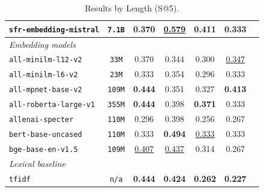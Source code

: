 \documentclass{article}
\begin{document}
\begin{table}[h!]
{\begin{tabular}{lcccccc}
\texttt{sfr-embedding-mistral} & \texttt{7.1B} & \textbf{0.370} & \underline{0.579} & 0.411 & \textbf{0.333} \\
\midrule
\multicolumn{6}{l}{\textit{Embedding models}} \\
\midrule
\texttt{all-minilm-l12-v2} & \texttt{33M} & 0.370 & 0.344 & 0.300 & \underline{0.347} \\
\texttt{all-minilm-l6-v2} & \texttt{23M} & 0.333 & 0.354 & 0.296 & 0.333 \\
\texttt{all-mpnet-base-v2} & \texttt{109M} & \textbf{0.444} & 0.351 & 0.327 & \textbf{0.413} \\
\texttt{all-roberta-large-v1} & \texttt{355M} & \textbf{0.444} & 0.398 & \textbf{0.371} & 0.333 \\
\texttt{allenai-specter} & \texttt{110M} & 0.296 & 0.398 & 0.256 & 0.267 \\
\texttt{bert-base-uncased} & \texttt{110M} & 0.333 & \textbf{0.494} & \underline{0.333} & 0.333 \\
\texttt{bge-base-en-v1.5} & \texttt{109M} & \underline{0.407} & \underline{0.437} & 0.314 & 0.267 \\
\midrule
\multicolumn{6}{l}{\textit{Lexical baseline}} \\
\midrule
\texttt{tfidf} & \texttt{n/a} & \textbf{0.444} & \textbf{0.424} & \textbf{0.262} & \textbf{0.227} \\
\bottomrule
\end{tabular}
}
\caption{Results by Length (S@5).}
\label{tab:length-s10-top}
\end{table}
\end{document}
